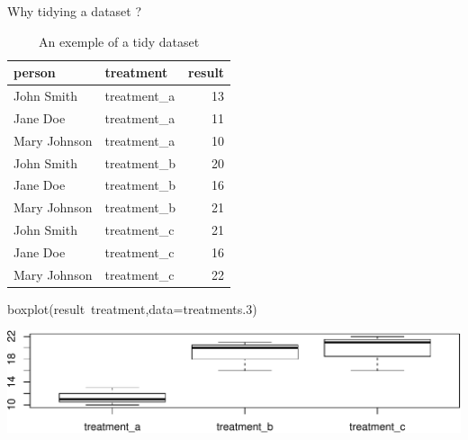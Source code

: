 \documentclass[14pt,ignorenonframetext,]{bredelebeamer}
\newenvironment{Shaded}{\begin{snugshade}}{\end{snugshade}}
\newcommand{\KeywordTok}[1]{\textcolor[rgb]{0.94,0.87,0.69}{#1}}
\newcommand{\DataTypeTok}[1]{\textcolor[rgb]{0.87,0.87,0.75}{#1}}
\newcommand{\DecValTok}[1]{\textcolor[rgb]{0.86,0.86,0.80}{#1}}
\newcommand{\OperatorTok}[1]{\textcolor[rgb]{0.94,0.94,0.82}{#1}}
\newcommand{\NormalTok}[1]{\textcolor[rgb]{0.80,0.80,0.80}{#1}}
\begin{document}
\begin{frame}[fragile]{Why tidying a dataset ?}

\begin{center}
\begin{table}[t]

\caption{\label{tab:unnamed-chunk-5}An exemple of a tidy dataset}
\centering
\begin{tabular}{l|l|r}
\hline
person & treatment & result\\
\hline
John Smith & treatment\_a & 13\\
\hline
Jane Doe & treatment\_a & 11\\
\hline
Mary Johnson & treatment\_a & 10\\
\hline
John Smith & treatment\_b & 20\\
\hline
Jane Doe & treatment\_b & 16\\
\hline
Mary Johnson & treatment\_b & 21\\
\hline
John Smith & treatment\_c & 21\\
\hline
Jane Doe & treatment\_c & 16\\
\hline
Mary Johnson & treatment\_c & 22\\
\hline
\end{tabular}
\end{table}
\end{center}

\begin{Shaded}
\begin{Highlighting}[]
\KeywordTok{boxplot}\NormalTok{(result}\OperatorTok{~}\NormalTok{treatment,}\DataTypeTok{data=}\NormalTok{treatments.}\DecValTok{3}\NormalTok{)}
\end{Highlighting}
\end{Shaded}

\includegraphics{tidyverse_28_03_files/figure-beamer/boxplot3-1.pdf}

\end{frame}
\end{document}

